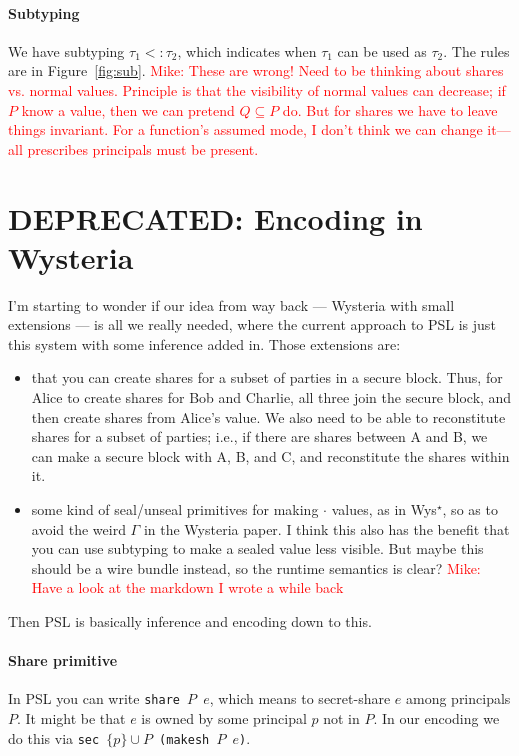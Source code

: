 \documentclass[10pt]{article}
\newcommand{\ssec}{\ensuremath{\mathtt{\cdot}}}
\newcommand{\subtype}{\ensuremath{<:}}
\newcommand{\issub}[2]{{#1} \subtype {#2}}
\newcommand{\mwh}[1]{\textcolor{red}{Mike: #1}}
\begin{document}
\paragraph{Subtyping}

We have subtyping $\issub{\tau_1}{\tau_2}$, which indicates when
$\tau_1$ can be used as $\tau_2$. The rules are in
Figure~\ref{fig:sub}. \mwh{These are wrong! Need to be thinking about
  shares vs. normal values. Principle is that the visibility of normal
  values can decrease; if $P$ know a value, then we can pretend $Q
  \subseteq P$ do. But for shares we have to leave things
  invariant. For a function's assumed mode, I don't think we can
  change it---all prescribes principals must be present.}


\section{DEPRECATED: Encoding in Wysteria}

I'm starting to wonder if our idea from way back --- Wysteria with
small extensions --- is all we really needed, where the current approach
to PSL is just this system with some inference added in. Those
extensions are:
\begin{itemize}
\item that you can create shares for a subset of parties in a secure
  block. Thus, for Alice to create shares for Bob and Charlie, all
  three join the secure block, and then create shares from Alice's
  value. We also need to be able to reconstitute shares for a subset
  of parties; i.e., if there are shares between A and B, we can make a
  secure block with A, B, and C, and reconstitute the shares within
  it. 
\item some kind of seal/unseal primitives for making $\ssec$ values, as
in Wys$^\star$, so as to avoid the weird $\Gamma$ in the Wysteria
paper. I think this also has the benefit that you can use subtyping to
make a sealed value less visible. But maybe this should be a wire
bundle instead, so the runtime semantics is clear?
\mwh{Have a look at the markdown I wrote a while back}
\end{itemize}

Then PSL is basically inference and encoding down to this.

\paragraph{Share primitive} In PSL you can write \texttt{share $P$
  $e$}, which means to secret-share $e$ among principals $P$. It might
be that $e$ is owned by some principal $p$ not in $P$. In our encoding
we do this via \texttt{sec $\{p\}\cup{P}$ (makesh $P$ $e$)}.
\end{document}
